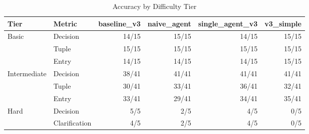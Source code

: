 \begin{table}[htbp]
\centering
\caption{Accuracy by Difficulty Tier}
\label{tab:tier-breakdown}
\begin{tabular}{ll rrrr}
\toprule
Tier & Metric & baseline\_v3 & naive\_agent & single\_agent\_v3 & v3\_simple \\
\midrule
  Basic & Decision & 14/15 & 15/15 & 14/15 & 15/15 \\
   & Tuple & 15/15 & 15/15 & 15/15 & 15/15 \\
   & Entry & 14/15 & 14/15 & 14/15 & 15/15 \\
  \midrule
  Intermediate & Decision & 38/41 & 41/41 & 41/41 & 41/41 \\
   & Tuple & 30/41 & 33/41 & 36/41 & 32/41 \\
   & Entry & 33/41 & 29/41 & 34/41 & 35/41 \\
  \midrule
  Hard & Decision & 5/5 & 2/5 & 4/5 & 0/5 \\
   & Clarification & 4/5 & 2/5 & 4/5 & 0/5 \\
\bottomrule
\end{tabular}
\end{table}
